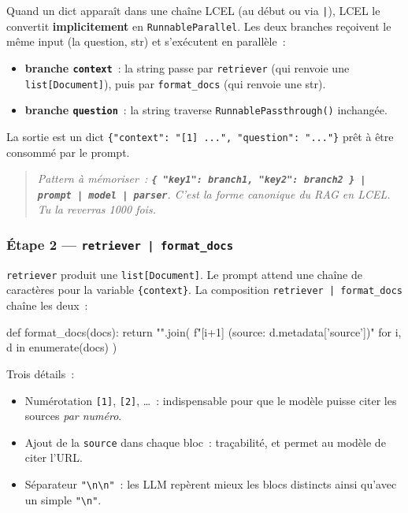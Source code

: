 \documentclass[11pt,a4paper]{article}
\begin{document}
Quand un dict apparaît dans une chaîne LCEL (au début ou via
\texttt{|}), LCEL le convertit \textbf{implicitement} en
\texttt{RunnableParallel}. Les deux branches reçoivent le même input
(la question, str) et s'exécutent en parallèle~:

\begin{itemize}[leftmargin=*]
  \item \textbf{branche \texttt{context}}~: la string passe par
        \texttt{retriever} (qui renvoie une \texttt{list[Document]}),
        puis par \texttt{format\_docs} (qui renvoie une str).
  \item \textbf{branche \texttt{question}}~: la string traverse
        \texttt{RunnablePassthrough()} inchangée.
\end{itemize}

La sortie est un dict \texttt{\{"context": "[1] ...", "question": "..."\}}
prêt à être consommé par le prompt.

\begin{quote}\itshape
Pattern à mémoriser~: \textbf{\texttt{\{ "key1": branch1, "key2":
branch2 \} | prompt | model | parser}}. C'est la forme canonique du RAG
en LCEL. Tu la reverras 1000 fois.
\end{quote}

\subsubsection*{Étape 2 — \texttt{retriever | format\_docs}}

\texttt{retriever} produit une \texttt{list[Document]}. Le prompt attend
une chaîne de caractères pour la variable \texttt{\{context\}}. La
composition \texttt{retriever | format\_docs} chaîne les deux~:

\begin{pythoncode}
def format_docs(docs):
    return "\n\n".join(
        f"[{i+1}] (source: {d.metadata['source']})"
        for i, d in enumerate(docs)
    )
\end{pythoncode}

Trois détails~:
\begin{itemize}[leftmargin=*]
  \item Numérotation \texttt{[1]}, \texttt{[2]}, \dots~: indispensable
        pour que le modèle puisse citer les sources \emph{par numéro}.
  \item Ajout de la \texttt{source} dans chaque bloc~: traçabilité, et
        permet au modèle de citer l'URL.
  \item Séparateur \texttt{"\textbackslash n\textbackslash n"}~: les LLM
        repèrent mieux les blocs distincts ainsi qu'avec un simple
        \texttt{"\textbackslash n"}.
\end{itemize}
\end{document}
